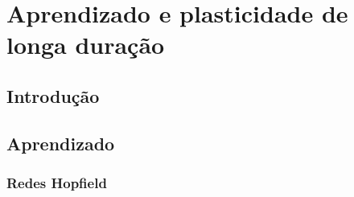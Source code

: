 \chapter{Aprendizado e plasticidade de longa duração}\label{cap:aprendizado}
\section{Introdução}\label{sec:aprendizado_intro}

\section{Aprendizado}\label{sec:aprendizado}

\subsection{Redes Hopfield}
